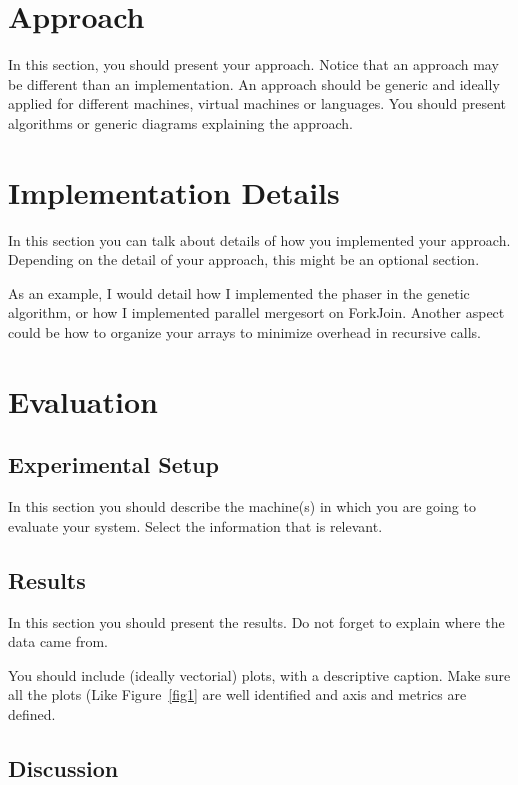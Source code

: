 \documentclass[runningheads]{llncs}
\begin{document}
\section{Approach}

In this section, you should present your approach. Notice that an approach may be different than an implementation. An approach should be generic and ideally applied for different machines, virtual machines or languages. You should present algorithms or generic diagrams explaining the approach.

\section{Implementation Details}

In this section you can talk about details of how you implemented your approach. Depending on the detail of your approach, this might be an optional section.

As an example, I would detail how I implemented the phaser in the genetic algorithm, or how I implemented parallel mergesort on ForkJoin. Another aspect could be how to organize your arrays to minimize overhead in recursive calls.


\section{Evaluation}

\subsection{Experimental Setup}

In this section you should describe the machine(s) in which you are going to evaluate your system. Select the information that is relevant.


\subsection{Results}

In this section you should present the results. Do not forget to explain where the data came from. 

You should include (ideally vectorial) plots, with a descriptive caption. Make sure all the plots (Like Figure~\ref{fig1} are well identified and axis and metrics are defined.

\subsection{Discussion}
\end{document}
